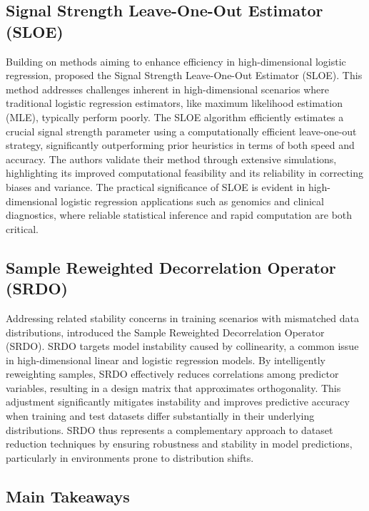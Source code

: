 \documentclass{article}
\theoremstyle{plain}
\theoremstyle{definition}
\theoremstyle{remark}
\begin{document}
\subsection{Signal Strength Leave-One-Out Estimator (SLOE)}

Building on methods aiming to enhance efficiency in high-dimensional logistic regression, \citeauthor{yad21} proposed the Signal Strength Leave-One-Out Estimator (SLOE). This method addresses challenges inherent in high-dimensional scenarios where traditional logistic regression estimators, like maximum likelihood estimation (MLE), typically perform poorly. The SLOE algorithm efficiently estimates a crucial signal strength parameter using a computationally efficient leave-one-out strategy, significantly outperforming prior heuristics in terms of both speed and accuracy. The authors validate their method through extensive simulations, highlighting its improved computational feasibility and its reliability in correcting biases and variance. The practical significance of SLOE is evident in high-dimensional logistic regression applications such as genomics and clinical diagnostics, where reliable statistical inference and rapid computation are both critical.

\subsection{Sample Reweighted Decorrelation Operator (SRDO)}

Addressing related stability concerns in training scenarios with mismatched data distributions, \citeauthor{shen20} introduced the Sample Reweighted Decorrelation Operator (SRDO). SRDO targets model instability caused by collinearity, a common issue in high-dimensional linear and logistic regression models. By intelligently reweighting samples, SRDO effectively reduces correlations among predictor variables, resulting in a design matrix that approximates orthogonality. This adjustment significantly mitigates instability and improves predictive accuracy when training and test datasets differ substantially in their underlying distributions. SRDO thus represents a complementary approach to dataset reduction techniques by ensuring robustness and stability in model predictions, particularly in environments prone to distribution shifts.

\subsection{Main Takeaways}
\end{document}
